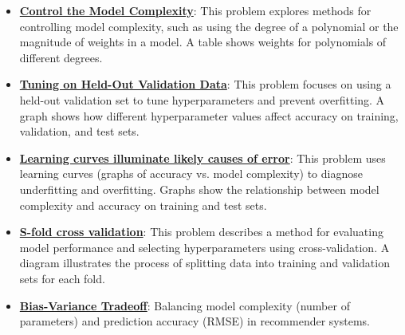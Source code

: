 \documentclass{article}%
\begin{document}
\begin{itemize}[leftmargin=*]
\item \href{https://purdue.brightspace.com/d2l/common/assets/pdfjs-d2l-dist/1.0.14-legacy/web/viewer.html?file=\%2Fcontent\%2Fenforced\%2F1095467-wl.202510.CS.24300.001\%2F10L1-CrossValidation.pdf\%3Fou\%3D1095467\&lang=en-us\&container=d2l-fileviewer-rendered-pdf\&fullscreen=d2l-fileviewer-rendered-pdf-dialog\&height=667#page=16}{\textbf{Control the Model Complexity}}: This problem explores methods for controlling model complexity, such as using the degree of a polynomial or the magnitude of weights in a model. A table shows weights for polynomials of different degrees.%
\item \href{https://purdue.brightspace.com/d2l/common/assets/pdfjs-d2l-dist/1.0.14-legacy/web/viewer.html?file=\%2Fcontent\%2Fenforced\%2F1095467-wl.202510.CS.24300.001\%2F10L1-CrossValidation.pdf\%3Fou\%3D1095467\&lang=en-us\&container=d2l-fileviewer-rendered-pdf\&fullscreen=d2l-fileviewer-rendered-pdf-dialog\&height=667#page=19}{\textbf{Tuning on Held-Out Validation Data}}: This problem focuses on using a held-out validation set to tune hyperparameters and prevent overfitting. A graph shows how different hyperparameter values affect accuracy on training, validation, and test sets.%
\item \href{https://purdue.brightspace.com/d2l/common/assets/pdfjs-d2l-dist/1.0.14-legacy/web/viewer.html?file=\%2Fcontent\%2Fenforced\%2F1095467-wl.202510.CS.24300.001\%2F10L1-CrossValidation.pdf\%3Fou\%3D1095467\&lang=en-us\&container=d2l-fileviewer-rendered-pdf\&fullscreen=d2l-fileviewer-rendered-pdf-dialog\&height=667#page=20}{\textbf{Learning curves illuminate likely causes of error}}: This problem uses learning curves (graphs of accuracy vs. model complexity) to diagnose underfitting and overfitting. Graphs show the relationship between model complexity and accuracy on training and test sets.%
\item \href{https://purdue.brightspace.com/d2l/common/assets/pdfjs-d2l-dist/1.0.14-legacy/web/viewer.html?file=\%2Fcontent\%2Fenforced\%2F1095467-wl.202510.CS.24300.001\%2F10L1-CrossValidation.pdf\%3Fou\%3D1095467\&lang=en-us\&container=d2l-fileviewer-rendered-pdf\&fullscreen=d2l-fileviewer-rendered-pdf-dialog\&height=667#page=25}{\textbf{S-fold cross validation}}: This problem describes a method for evaluating model performance and selecting hyperparameters using cross-validation. A diagram illustrates the process of splitting data into training and validation sets for each fold.%
\item \href{https://purdue.brightspace.com/d2l/common/assets/pdfjs-d2l-dist/1.0.14-legacy/web/viewer.html?file=\%2Fcontent\%2Fenforced\%2F1095467-wl.202510.CS.24300.001\%2F11L2-svd-pca-recommender.pdf\%3Fou\%3D1095467\&lang=en-us\&container=d2l-fileviewer-rendered-pdf\&fullscreen=d2l-fileviewer-rendered-pdf-dialog\&height=667#page=53}{\textbf{Bias-Variance Tradeoff}}: Balancing model complexity (number of parameters) and prediction accuracy (RMSE) in recommender systems.%

\end{itemize}
\end{document}
